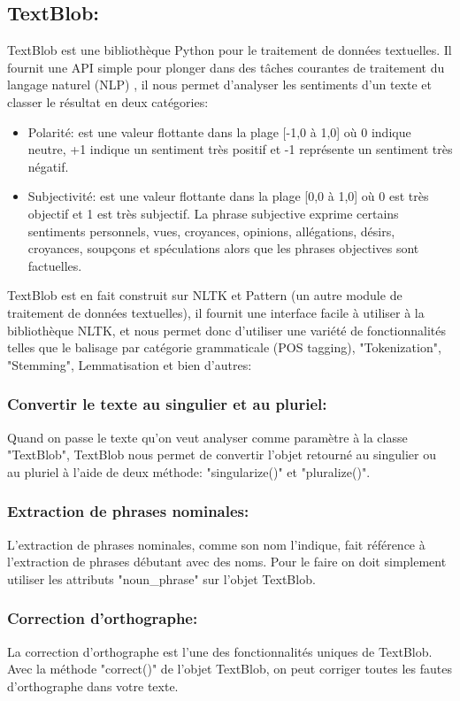 \subsection{TextBlob:}
TextBlob est une bibliothèque Python pour le traitement de données textuelles. Il fournit une API simple pour plonger dans des tâches courantes de traitement du langage naturel (NLP) \cite{loria2018textblob}, il nous permet d'analyser les sentiments d'un texte et classer le résultat en deux catégories:
\begin{itemize}
    \item \textcolor{DispositionColor}{Polarité:} est une valeur flottante dans la plage [-1,0 à 1,0] où 0 indique neutre, +1 indique un sentiment très positif et -1 représente un sentiment très négatif.
    \item \textcolor{DispositionColor}{Subjectivité:} est une valeur flottante dans la plage [0,0 à 1,0] où 0 est très objectif et 1 est très subjectif. La phrase subjective exprime certains sentiments personnels, vues, croyances, opinions, allégations, désirs, croyances, soupçons et spéculations alors que les phrases objectives sont factuelles.
\end{itemize}
TextBlob est en fait construit sur NLTK et Pattern (un autre module de traitement de données textuelles), il fournit une interface facile à utiliser à la bibliothèque NLTK, et nous permet donc d'utiliser une variété de fonctionnalités telles que le balisage par catégorie grammaticale (POS tagging), "Tokenization", "Stemming", Lemmatisation et bien d'autres:
\subsubsection{Convertir le texte au singulier et au pluriel:}
Quand on passe le texte qu'on veut analyser comme paramètre à la classe "TextBlob", TextBlob nous permet de convertir l'objet retourné au singulier ou au pluriel à l'aide de deux méthode: "singularize()" et "pluralize()".
\subsubsection{Extraction de phrases nominales:}
L'extraction de phrases nominales, comme son nom l'indique, fait référence à l'extraction de phrases débutant avec des noms. Pour le faire on doit simplement utiliser les attributs "noun\_phrase" sur l'objet TextBlob.
\subsubsection{Correction d'orthographe:}
La correction d'orthographe est l'une des fonctionnalités uniques de TextBlob. Avec la méthode "correct()" de l'objet TextBlob, on peut corriger toutes les fautes d'orthographe dans votre texte.
